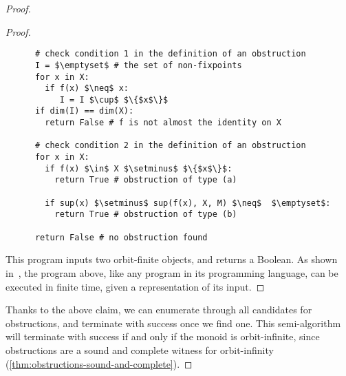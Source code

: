 \begin{proof}
\begin{proof}
\begin{lstlisting}
	  # check condition 1 in the definition of an obstruction
      I = $\emptyset$ # the set of non-fixpoints
      for x in X:
        if f(x) $\neq$ x:
           I = I $\cup$ $\{$x$\}$
      if dim(I) == dim(X): 
        return False # f is not almost the identity on X

      # check condition 2 in the definition of an obstruction
      for x in X: 
        if f(x) $\in$ X $\setminus$ $\{$x$\}$:
          return True # obstruction of type (a)

        if sup(x) $\setminus$ sup(f(x), X, M) $\neq$  $\emptyset$:
          return True # obstruction of type (b)
    
      return False # no obstruction found
        \end{lstlisting}
    This program inputs two orbit-finite objects, and returns a Boolean.
    As shown in~\cite[Theorem 11.2]{bojanczyk_slightly2018}, the program above, like any program in its programming language, can be executed in finite time, given a representation of its input. 		
    \end{proof}

    Thanks to the above claim, we can enumerate through all candidates for obstructions, and terminate with success once we find one. This semi-algorithm will terminate with success if and only if the monoid is orbit-infinite, since obstructions are a sound and complete witness for orbit-infinity (\cref{thm:obstructions-sound-and-complete}).
\end{proof}


